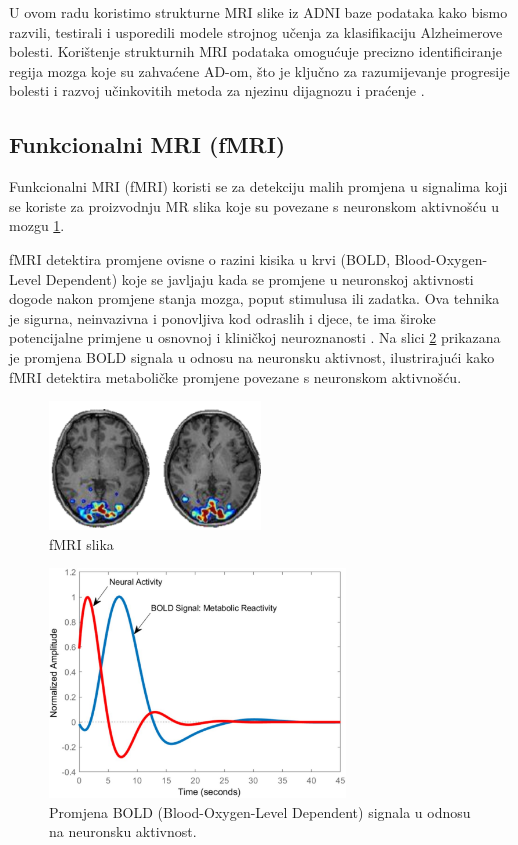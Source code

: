 \documentclass[zavrsnirad]{fer}
\begin{document}
 U ovom radu koristimo strukturne MRI slike iz ADNI baze podataka kako bismo razvili, testirali i usporedili modele strojnog učenja za klasifikaciju Alzheimerove bolesti. Korištenje strukturnih MRI podataka omogućuje precizno identificiranje regija mozga koje su zahvaćene AD-om, što je ključno za razumijevanje progresije bolesti i razvoj učinkovitih metoda za njezinu dijagnozu i praćenje \cite{Gonuguntla2022}.


\subsection{Funkcionalni MRI (fMRI)}

Funkcionalni MRI (fMRI) koristi se za detekciju malih promjena u signalima koji se koriste za proizvodnju MR slika koje su povezane s neuronskom aktivnošću u mozgu \ref{fig:fMRI}. 

fMRI detektira promjene ovisne o razini kisika u krvi (BOLD, Blood-Oxygen-Level Dependent) koje se javljaju kada se promjene u neuronskoj aktivnosti dogode nakon promjene stanja mozga, poput stimulusa ili zadatka. Ova tehnika je sigurna, neinvazivna i ponovljiva kod odraslih i djece, te ima široke potencijalne primjene u osnovnoj i kliničkoj neuroznanosti \cite{Gore2003}. Na slici \ref{fig:fMRI_BOLD} prikazana je promjena BOLD signala u odnosu na neuronsku aktivnost, ilustrirajući kako fMRI detektira metaboličke promjene povezane s neuronskom aktivnošću.


\begin{figure}[h]
	\centering
	\includegraphics[width=0.5\textwidth]{Figures/fMRI.png}
	\caption{fMRI slika \cite{ucsd2021}}
	\label{fig:fMRI}
\end{figure}

\begin{figure}[h]
	\centering
	\includegraphics[width=0.7\textwidth]{Figures/BOLD.jpg}
	\caption{Promjena BOLD (Blood-Oxygen-Level Dependent) signala u odnosu na neuronsku aktivnost.\cite{Schaper573006}}
	\label{fig:fMRI_BOLD}
\end{figure}
\end{document}
